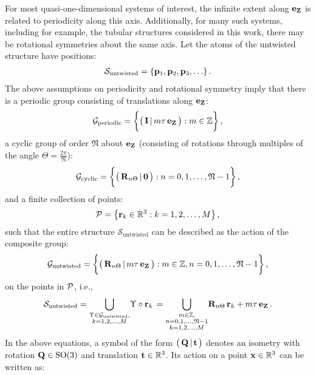 \documentclass[preprint,12pt, 3p, sort&compress]{elsarticle}
\begin{document}
For most quasi-one-dimensional systems of interest, the infinite extent along ${\bf e}_{{\bf Z}}$ is related  to periodicity along this axis. Additionally, for many such systems, including for example, the tubular structures considered in this work, there may be rotational symmetries about the same axis. Let the atoms of the untwisted structure have positions: 
\begin{align}
\mathcal{S}_{\text{untwisted}} = \{{\bf p}_1,  {\bf p}_2, {\bf p}_3,\ldots \}\,.
\end{align}
The above assumptions on periodicity and rotational symmetry imply that there is a periodic group consisting of translations along ${\bf e}_{{\bf Z}}$: 
\begin{align}
{\cal G}_{\text{periodic}} = \bigg\{\big(\,{{\bf I}} \,| \,m\tau\,{\bf e}_{{\bf Z}}\,\big): m \in \mathbb{Z}\bigg\}\,,
\end{align}
a cyclic group of order $\mathfrak{N}$ about  ${\bf e}_{{\bf Z}}$ (consisting of rotations through multiples of the angle $\displaystyle\Theta = \frac{2\pi}{\mathfrak{N}}$):
\begin{align}
{\cal G}_{\text{cyclic}} = \bigg\{\big({\,{{\bf R}}}_{n\Theta} \,|\,\mathbf{0}\,\big): n=0,1,\ldots,\mathfrak{N}-1 \bigg\}\,,
\end{align}
and a finite collection of points:
\begin{align}
{\cal P} = \big\{{\bf r}_k \in \mathbb{R}^3: k = 1,2,\ldots,M\big\}\,,
\label{eq:points_in_P}
\end{align}
such that the entire structure $\mathcal{S}_{\text{untwisted}}$ can be described as the action of the composite group:
\begin{align}
{\cal G}_{\text{untwisted}} = \bigg\{\big(\,{{\bf R}}_{n\Theta} \,|\,m\tau\,{\bf e}_{{\bf Z}}\,\big) : m \in \mathbb{Z}, n=0,1,\ldots,\mathfrak{N}-1\bigg\}\,,
\end{align}
on the points in ${\cal P}$, i.e.,
\begin{align}
\mathcal{S}_{\text{untwisted}} =\bigcup_{\substack{{\Upsilon} \in {\cal G}_{\text{untwisted}},\\  k = 1,2,\ldots,M }}\!{\Upsilon} \circ {\bf r}_k\, = \bigcup_{\substack{m \in \mathbb{Z},\\  n=0,1,\ldots,\mathfrak{N}-1 \\ k = 1,2, \ldots, M}}\!{{\bf R}}_{n\Theta}\,{\bf r}_k + m\tau\,{\bf e}_{{\bf Z}}\,.
\label{eq:S_untwisted}
\end{align}
In the above equations, a symbol of the form $\big(\,{{\bf Q}}\,|\,{\bf t} \,\big)$ denotes an isometry with rotation ${{\bf Q}} \in \text{SO}(3)$ and translation ${\bf t} \in \mathbb{R}^3$. Its action on a point ${\bf x} \in \mathbb{R}^3$ can be written as:
\end{document}
